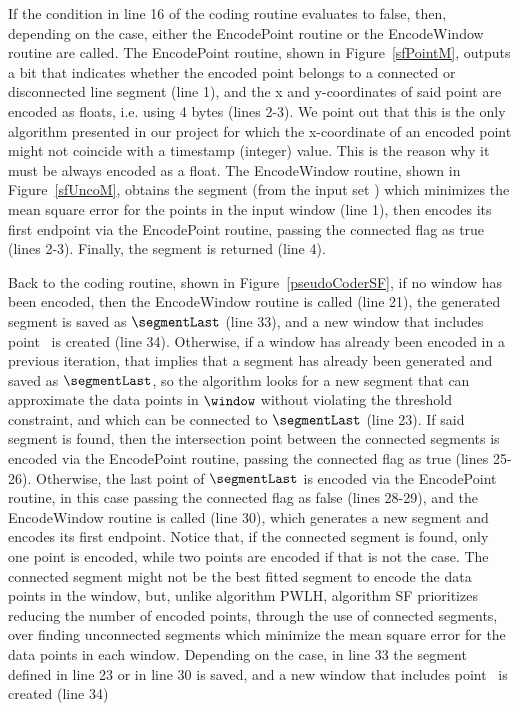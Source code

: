 If the condition in line 16 of the coding routine evaluates to false, then, depending on the case, either the EncodePoint routine or the EncodeWindow routine are called. The EncodePoint routine, shown in Figure~\ref{sfPointM}, outputs a bit that indicates whether the encoded point belongs to a connected or disconnected line segment (line 1), and the x and y-coordinates of said point are encoded as floats, i.e. using 4 bytes (lines 2-3). We point out that this is the only algorithm presented in our project for which the x-coordinate of an encoded point might not coincide with a timestamp (integer) value. This is the reason why it must be always encoded as a float. The EncodeWindow routine, shown in Figure~\ref{sfUncoM}, obtains the segment (from the input set \segmentSet) which minimizes the mean square error for the points in the input window (line 1), then encodes its first endpoint via the EncodePoint routine, passing the connected flag as true (lines 2-3). Finally, the segment is returned (line 4).


Back to the coding routine, shown in Figure~\ref{pseudoCoderSF}, if no window has been encoded, then the EncodeWindow routine is called (line 21), the generated segment is saved as $\segmentLast$ (line 33), and a new window that includes point \point\ is created (line 34). Otherwise, if a window has already been encoded in a previous iteration, that implies that a segment has already been generated and saved as $\segmentLast$, so the algorithm looks for a new segment that can approximate the data points in $\window$ without violating the threshold constraint, and which can be connected to $\segmentLast$ (line 23). If said segment is found, then the intersection point between the connected segments is encoded via the EncodePoint routine, passing the connected flag as true (lines 25-26). Otherwise, the last point of $\segmentLast$ is encoded via the EncodePoint routine, in this case passing the connected flag as false (lines 28-29), and the EncodeWindow routine is called (line 30), which generates a new segment and encodes its first endpoint. Notice that, if the connected segment is found, only one point is encoded, while two points are encoded if that is not the case. The connected segment might not be the best fitted segment to encode the data points in the window, but, unlike algorithm PWLH, algorithm SF prioritizes reducing the number of encoded points, through the use of connected segments, over finding unconnected segments which minimize the mean square error for the data points in each window. Depending on the case, in line 33 the segment defined in line 23 or in line 30 is saved, and a new window that includes point \point\ is created (line 34)


